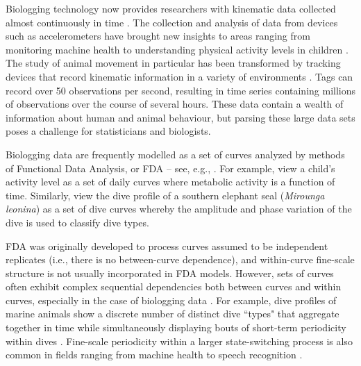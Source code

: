 
Biologging technology now provides researchers with kinematic data collected almost continuously in time \citep{Hooten:2017}.
The collection and analysis of data from devices such as accelerometers have brought new insights to areas ranging from monitoring machine health \citep{Getman:2009} to understanding physical activity levels in children \citep{Morris:2007}. The study of animal movement in particular has been transformed by tracking devices that record kinematic information in a variety of environments \citep{Borger:2020,Dot:2016b}. Tags can record over 50 observations per second, resulting in time series containing millions of observations over the course of several hours. These data contain a wealth of information about human and animal behaviour, but parsing these large data sets poses a challenge for statisticians and biologists.

Biologging data are frequently modelled as a set of curves analyzed by methods of Functional Data Analysis, or FDA -- see, e.g., \citet{Ramsay:2005}. For example, \citet{Morris:2007} view a child's activity level as a set of daily curves where metabolic activity is a function of time. Similarly, \citet{Fu:2017} view the dive profile of a southern elephant seal (\textit{Mirounga leonina}) as a set of dive curves whereby the amplitude and phase variation of the dive is used to classify dive types.
%

FDA was originally developed to process curves assumed to be independent replicates (i.e., there is no between-curve dependence), and within-curve fine-scale structure is not usually incorporated in FDA models. However, sets of curves often exhibit complex sequential dependencies both between curves and within curves, especially in the case of biologging data \citep{Barajas:2017}.
For example, dive profiles of marine animals show a discrete number of distinct dive ``types" that aggregate together in time \citep{Tennessen:2019b} while simultaneously displaying bouts of short-term periodicity within dives \citep{Adam:2019}. Fine-scale periodicity within a larger state-switching process is also common in fields ranging from machine health \citep{Xin:2018,Lucero:2019} to speech recognition \citep{Juang:1991}. 

